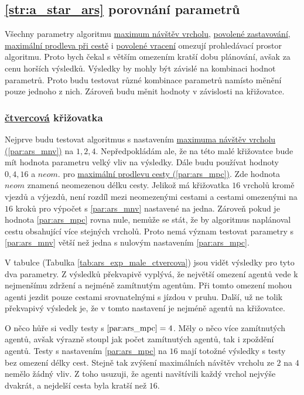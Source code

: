 \subsection{\ref{str:a_star_ars} porovnání parametrů}\label{subsec:ars_porovnani_parametru}

Všechny parametry algoritmu \hyperref[par:ars_mnv]{maximum návštěv vrcholu}, \hyperref[par:ars_pz]{povolené zastavování},
\hyperref[par:ars_mpc]{maximální prodleva při cestě} i \hyperref[par:ars_pv]{povolené vracení} omezují prohledávací
prostor algoritmu.
Proto bych čekal s větším omezením kratší dobu plánování, avšak za cenu horších výsledků.
Výsledky by mohly být závislé na kombinaci hodnot parametrů.
Proto budu testovat různé kombinace parametrů namísto měnění pouze jednoho z nich.
Zároveň budu měnit hodnoty v závislosti na křižovatce.

\subsubsection{ \hyperref[subsec:ctvercovy_typ]{čtvercová} křižovatka}
\label{subsubsec:exp_ars_mala_ctvercova_krizovatka}

Nejprve budu testovat algoritmus s nastavením \hyperref[par:ars_mnv]{maximuma návštěv vrcholu (\ref{par:ars_mnv})} na $1, 2, 4$.
Nepředpokládám ale, že na této malé křižovatce bude mít hodnota parametru velký vliv na výsledky.
Dále budu používat hodnoty $0, 4, 16$ a $neom.$ pro \hyperref[par:ars_mpc]{maximální prodlevu cesty (\ref{par:ars_mpc})}.
Zde hodnota $neom$ znamená neomezenou délku cesty.
Jelikož má křižovatka $16$ vrcholů kromě vjezdů a výjezdů, není rozdíl mezi neomezenými cestami a
cestami omezenými na $16$ kroků pro výpočet s \ref{par:ars_mnv} nastavené na jedna.
Zároveň pokud je hodnota \ref{par:ars_mpc} rovna nule, nemůže se stát,
že by algoritmus naplánoval cestu obsahující více stejných vrcholů.
Proto nemá význam testovat parametry s \ref{par:ars_mnv} větší než jedna s nulovým nastavením \ref{par:ars_mpc}.

V tabulce (Tabulka \ref{tab:ars_exp_male_ctvercova}) jsou vidět výsledky pro tyto dva parametry.
Z výsledků překvapivě vyplývá, že největší omezení agentů vede k nejmenšímu zdržení a nejméně zamítnutým agentům.
Při tomto omezení mohou agenti jezdit pouze cestami srovnatelnými s jízdou v pruhu.
Další, už ne tolik překvapivý výsledek je, že v tomto nastavení je nejméně agentů na křižovatce.

O něco hůře si vedly testy s $\ref{par:ars_mpc} = 4$.
Měly o něco více zamítnutých agentů, avšak výrazně stoupl jak počet zamítnutých agentů, tak i zpoždění agentů.
Testy s nastavením \ref{par:ars_mpc} na $16$ mají totožné výsledky s testy bez omezení délky cest.
Stejně tak zvýšení maximálních návštěv vrcholu ze $2$ na $4$ nemělo žádný vliv.
Z toho usuzuji, že agenti navštívili každý vrchol nejvýše dvakrát, a nejdelší cesta byla kratší než $16$.

